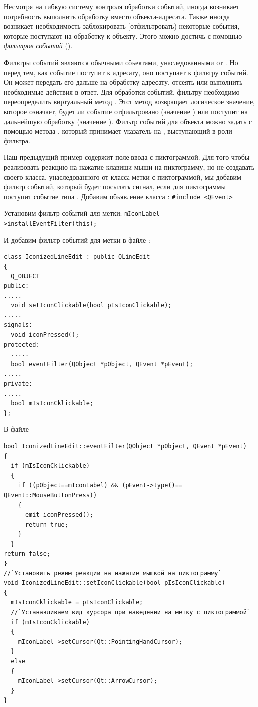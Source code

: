 Несмотря на гибкую систему контроля обработки событий, иногда возникает потребность выполнить обработку вместо
объекта-адресата. Также иногда возникает необходимость заблокировать (отфильтровать) некоторые события, которые
поступают на обработку к объекту. Этого можно достичь с помощью \emph{фильтров событий}
().

Фильтры событий являются обычными объектами, унаследованными от . Но перед тем, как событие
поступит к адресату, оно поступает к фильтру событий. Он может передать его дальше на обработку адресату, отсеять или
выполнить необходимые действия в ответ. Для обработки событий, фильтру необходимо переопределить виртуальный метод
. Этот метод возвращает логическое значение, которое означает, будет ли событие
отфильтровано (значение ) или поступит на дальнейшую обработку (значение ).
Фильтр событий для объекта можно задать с помощью метода , который
принимает указатель на , выступающий в роли фильтра. 

Наш предыдущий пример содержит поле ввода с пиктограммой. Для того чтобы реализовать реакцию на нажатие клавиши мыши на
пиктограмму, но не создавать своего класса, унаследованного от класса метки с пиктограммой, мы добавим фильтр событий,
который будет посылать сигнал, если для пиктограммы поступит событие типа .
Добавим объявление класса :
\lstinline!#include <QEvent>!

Установим фильтр событий для метки:
\lstinline!mIconLabel->installEventFilter(this);!

И добавим фильтр событий для метки в файле :
\begin{lstlisting}
class IconizedLineEdit : public QLineEdit
{
  Q_OBJECT
public:
.....
  void setIconClickable(bool pIsIconClickable);
.....
signals:
  void iconPressed();
protected:
  .....
  bool eventFilter(QObject *pObject, QEvent *pEvent);
.....
private:
.....
  bool mIsIconCklickable;
};
\end{lstlisting}

В файле 
\begin{lstlisting}
bool IconizedLineEdit::eventFilter(QObject *pObject, QEvent *pEvent)
{
  if (mIsIconCklickable)
  {
    if ((pObject==mIconLabel) && (pEvent->type()== QEvent::MouseButtonPress))
    {
      emit iconPressed();
      return true;
    }
  }
return false;
}
//`Установить режим реакции на нажатие мышкой на пиктограмму`
void IconizedLineEdit::setIconClickable(bool pIsIconClickable)
{
  mIsIconCklickable = pIsIconClickable;
  //`Устанавливаем вид курсора при наведении на метку с пиктограммой`
  if (mIsIconCklickable)
  {
    mIconLabel->setCursor(Qt::PointingHandCursor);
  }
  else
  {
    mIconLabel->setCursor(Qt::ArrowCursor);
  }
}
\end{lstlisting}

